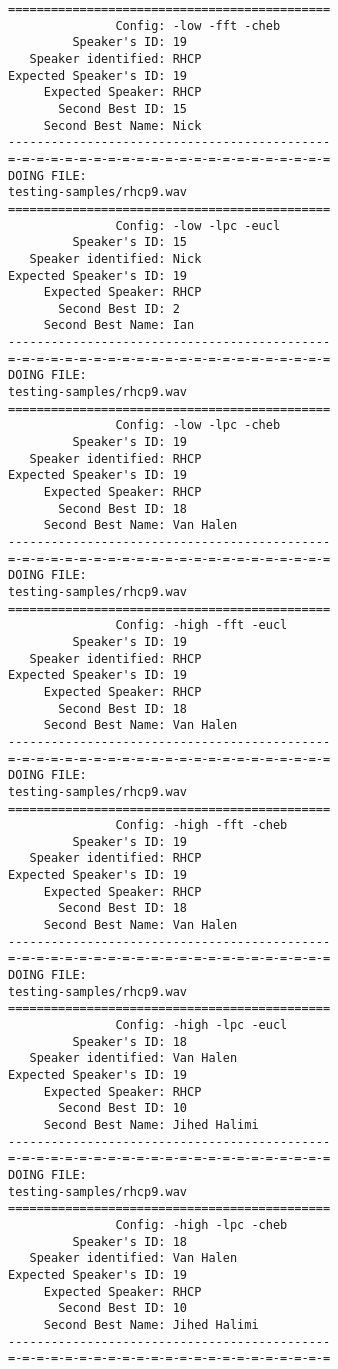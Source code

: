 \begin{verbatim}
=============================================
               Config: -low -fft -cheb
         Speaker's ID: 19
   Speaker identified: RHCP
Expected Speaker's ID: 19
     Expected Speaker: RHCP
       Second Best ID: 15
     Second Best Name: Nick
---------------------------------------------
=-=-=-=-=-=-=-=-=-=-=-=-=-=-=-=-=-=-=-=-=-=-=
DOING FILE:
testing-samples/rhcp9.wav
=============================================
               Config: -low -lpc -eucl
         Speaker's ID: 15
   Speaker identified: Nick
Expected Speaker's ID: 19
     Expected Speaker: RHCP
       Second Best ID: 2
     Second Best Name: Ian
---------------------------------------------
=-=-=-=-=-=-=-=-=-=-=-=-=-=-=-=-=-=-=-=-=-=-=
DOING FILE:
testing-samples/rhcp9.wav
=============================================
               Config: -low -lpc -cheb
         Speaker's ID: 19
   Speaker identified: RHCP
Expected Speaker's ID: 19
     Expected Speaker: RHCP
       Second Best ID: 18
     Second Best Name: Van Halen
---------------------------------------------
=-=-=-=-=-=-=-=-=-=-=-=-=-=-=-=-=-=-=-=-=-=-=
DOING FILE:
testing-samples/rhcp9.wav
=============================================
               Config: -high -fft -eucl
         Speaker's ID: 19
   Speaker identified: RHCP
Expected Speaker's ID: 19
     Expected Speaker: RHCP
       Second Best ID: 18
     Second Best Name: Van Halen
---------------------------------------------
=-=-=-=-=-=-=-=-=-=-=-=-=-=-=-=-=-=-=-=-=-=-=
DOING FILE:
testing-samples/rhcp9.wav
=============================================
               Config: -high -fft -cheb
         Speaker's ID: 19
   Speaker identified: RHCP
Expected Speaker's ID: 19
     Expected Speaker: RHCP
       Second Best ID: 18
     Second Best Name: Van Halen
---------------------------------------------
=-=-=-=-=-=-=-=-=-=-=-=-=-=-=-=-=-=-=-=-=-=-=
DOING FILE:
testing-samples/rhcp9.wav
=============================================
               Config: -high -lpc -eucl
         Speaker's ID: 18
   Speaker identified: Van Halen
Expected Speaker's ID: 19
     Expected Speaker: RHCP
       Second Best ID: 10
     Second Best Name: Jihed Halimi
---------------------------------------------
=-=-=-=-=-=-=-=-=-=-=-=-=-=-=-=-=-=-=-=-=-=-=
DOING FILE:
testing-samples/rhcp9.wav
=============================================
               Config: -high -lpc -cheb
         Speaker's ID: 18
   Speaker identified: Van Halen
Expected Speaker's ID: 19
     Expected Speaker: RHCP
       Second Best ID: 10
     Second Best Name: Jihed Halimi
---------------------------------------------
=-=-=-=-=-=-=-=-=-=-=-=-=-=-=-=-=-=-=-=-=-=-=

\end{verbatim}
